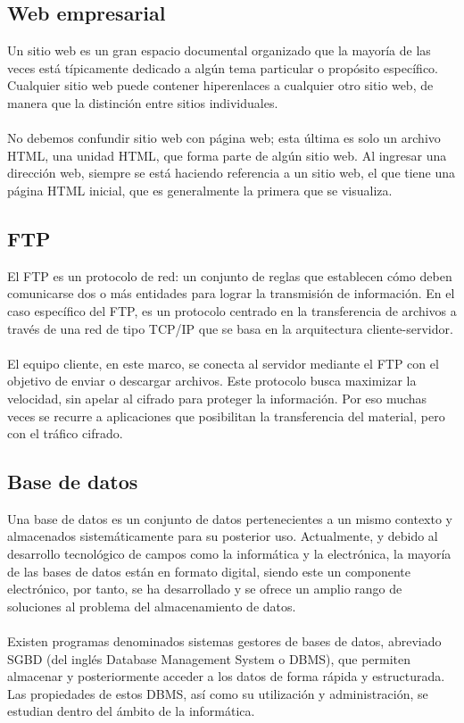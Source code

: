 \documentclass[12pt,letterpaper]{article}
\begin{document}
\subsection{Web empresarial}
Un sitio web es un gran espacio documental organizado que la mayoría de las veces está 
típicamente dedicado a algún tema particular o propósito específico. Cualquier sitio web 
puede contener hiperenlaces a cualquier otro sitio web, de manera que la distinción entre 
sitios individuales.
\\ \\ 
No debemos confundir sitio web con página web; esta última es solo un archivo HTML, una 
unidad HTML, que forma parte de algún sitio web. Al ingresar una dirección web, siempre 
se está haciendo referencia a un sitio web, el que tiene una página HTML inicial, que es 
generalmente la primera que se visualiza. 

\subsection{FTP}
El FTP es un protocolo de red: un conjunto de reglas que establecen cómo deben comunicarse 
dos o más entidades para lograr la transmisión de información. En el caso específico del 
FTP, es un protocolo centrado en la transferencia de archivos a través de una red de tipo 
TCP/IP que se basa en la arquitectura cliente-servidor.
\\ \\ 
El equipo cliente, en este marco, se conecta al servidor mediante el FTP con el objetivo 
de enviar o descargar archivos. Este protocolo busca maximizar la velocidad, sin apelar 
al cifrado para proteger la información. Por eso muchas veces se recurre a aplicaciones 
que posibilitan la transferencia del material, pero con el tráfico cifrado.

\subsection{Base de datos}
Una base de datos es un conjunto de datos pertenecientes a un mismo contexto y almacenados 
sistemáticamente para su posterior uso. Actualmente, y debido al desarrollo tecnológico de 
campos como la informática y la electrónica, la mayoría de las bases de datos están en 
formato digital, siendo este un componente electrónico, por tanto, se ha desarrollado y 
se ofrece un amplio rango de soluciones al problema del almacenamiento de datos.
\\ \\ 
Existen programas denominados sistemas gestores de bases de datos, abreviado SGBD (del 
inglés Database Management System o DBMS), que permiten almacenar y posteriormente acceder 
a los datos de forma rápida y estructurada. Las propiedades de estos DBMS, así como su 
utilización y administración, se estudian dentro del ámbito de la informática.
\end{document}
